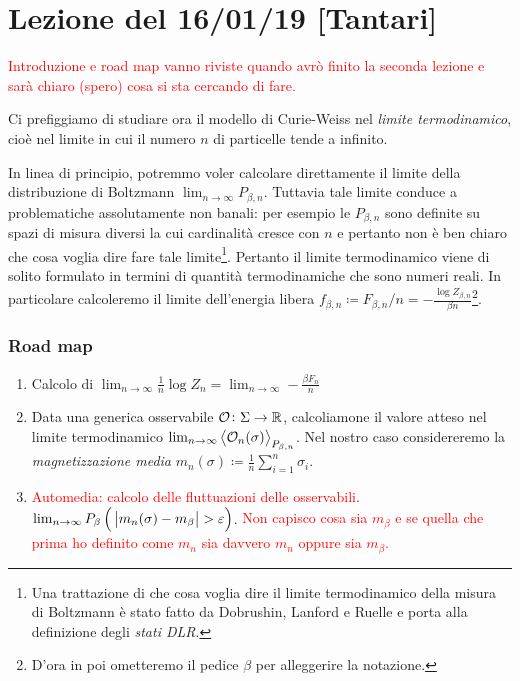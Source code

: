 \section{Lezione del 16/01/19 [Tantari]}
\textcolor{red}{Introduzione e road map vanno riviste quando avrò finito la seconda lezione e sarà chiaro (spero) cosa si sta cercando di fare.}

Ci prefiggiamo di studiare ora il modello di Curie-Weiss nel \emph{limite termodinamico}, cioè nel limite in cui il numero $ n $ di particelle tende a infinito.

In linea di principio, potremmo voler calcolare direttamente il limite della distribuzione di Boltzmann $ \lim_{n \to \infty} P_{\beta, n} $. Tuttavia tale limite conduce a problematiche assolutamente non banali: per esempio le $ P_{\beta, n} $ sono definite su spazi di misura diversi la cui cardinalità cresce con $ n $ e pertanto non è ben chiaro che cosa voglia dire fare tale limite\footnote{Una trattazione di che cosa voglia dire il limite termodinamico della misura di Boltzmann è stato fatto da Dobrushin, Lanford e Ruelle e porta alla definizione degli \emph{stati DLR}.}. Pertanto il limite termodinamico viene di solito formulato in termini di quantità termodinamiche che sono numeri reali. In particolare calcoleremo il limite dell'energia libera $ f_{\beta, n} \coloneqq F_{\beta, n}/n = -\frac{\log Z_{\beta, n}}{\beta n}$\footnote{D'ora in poi ometteremo il pedice $ \beta $ per alleggerire la notazione.}.

\subsubsection{Road map}
\begin{enumerate}
  \item Calcolo di $ \lim_{n\to\infty} \frac{1}{n} \log{Z_n} = \lim_{n\to\infty} -\frac{\beta F_n}{n} $
  \item Data una generica osservabile $ \mathcal{O}\colon\Sigma\to\mathbb{R} $, calcoliamone il valore atteso nel limite termodinamico $ \lim_{n\to\infty} \left< \mathcal{O}_n(\sigma) \right>_{P_{\beta, n}} $. Nel nostro caso considereremo la \emph{magnetizzazione media} $ m_n(\sigma) \coloneqq \frac{1}{n}\sum_{i=1}^{n}\sigma_i $.
  \item \textcolor{red}{Automedia: calcolo delle fluttuazioni delle osservabili}.
  $ \lim_{n\to\infty} P_\beta\left(\ \abs{m_n(\sigma) - m_\beta } > \varepsilon \right) $.
  \textcolor{red}{Non capisco cosa sia $ m_\beta $ e se quella che prima ho definito come $ m_n $ sia davvero $ m_n $ oppure sia $ m_\beta $.}
\end{enumerate}

